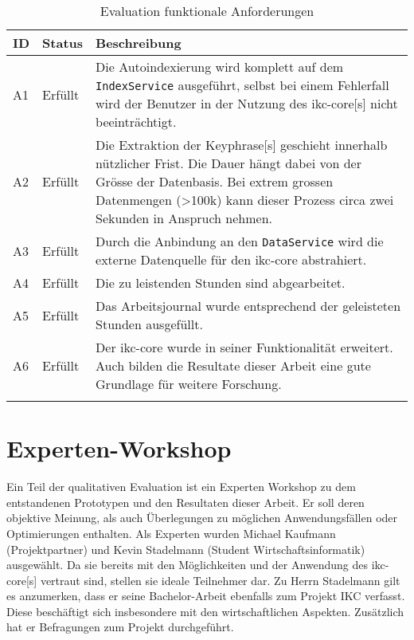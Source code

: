 \begin{longtable}{|p{1.5cm} | p{1.5cm} | p{8.1cm}|}
  \hline
    ID & Status & Beschreibung \\\hline
    A1 & Erfüllt & Die Autoindexierung wird komplett auf dem \texttt{IndexService} ausgeführt, selbst bei einem Fehlerfall wird der Benutzer in der Nutzung des \gls{ikc-core}[s] nicht beeinträchtigt.\\\hline
    A2 & Erfüllt & Die Extraktion der \gls{Keyphrase}[s] geschieht innerhalb nützlicher Frist. Die Dauer hängt dabei von der Grösse der Datenbasis. Bei extrem grossen Datenmengen (>100k) kann dieser Prozess circa zwei Sekunden in Anspruch nehmen.\\\hline
    A3 & Erfüllt & Durch die Anbindung an den \texttt{DataService} wird die externe Datenquelle für den \gls{ikc-core} abstrahiert.\\\hline
    A4 & Erfüllt & Die zu leistenden Stunden sind abgearbeitet.\\\hline
    A5 & Erfüllt & Das Arbeitsjournal wurde entsprechend der geleisteten Stunden ausgefüllt.\\\hline
    A6 & Erfüllt & Der \gls{ikc-core} wurde in seiner Funktionalität erweitert. Auch bilden die Resultate dieser Arbeit eine gute Grundlage für weitere Forschung.\\\hline
    \caption{Evaluation funktionale Anforderungen}
  \label{tab:nicht-funktionale-anforderungen-eval}
\end{longtable}

\section{Experten-Workshop}

Ein Teil der qualitativen Evaluation ist ein Experten Workshop zu dem entstandenen Prototypen und den Resultaten dieser Arbeit. Er soll deren objektive Meinung, als auch Überlegungen zu möglichen Anwendungsfällen oder Optimierungen enthalten. Als Experten wurden Michael Kaufmann (Projektpartner) und Kevin Stadelmann (Student Wirtschaftsinformatik) ausgewählt. Da sie bereits mit den Mög\-lich\-keit\-en und der Anwendung des \gls{ikc-core}[s] vertraut sind, stellen sie ideale Teilnehmer dar. Zu Herrn Stadelmann gilt es anzumerken, dass er seine Bachelor-Arbeit ebenfalls zum Projekt \gls{IKC} verfasst. Diese beschäftigt sich insbesondere mit den wirtschaftlichen Aspekten. Zusätzlich hat er Befragungen zum Projekt durchgeführt.

